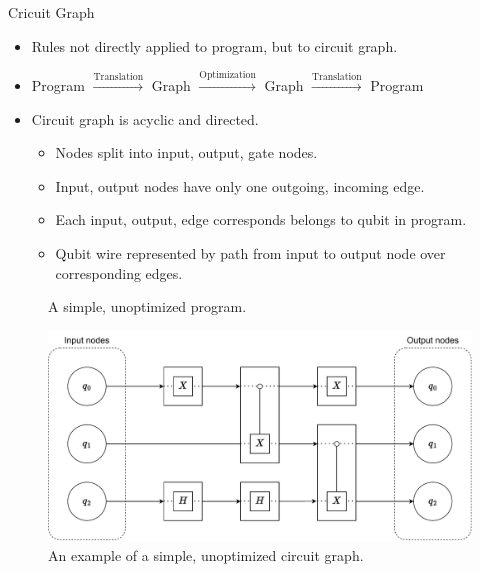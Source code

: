 \begin{frame}{Cricuit Graph}
    \begin{itemize}
        \item Rules not directly applied to program, but to circuit graph.
        \item Program $\xrightarrow{\text{Translation}}$ Graph $\xrightarrow{\text{Optimization}}$ Graph $\xrightarrow{\text{Translation}}$ Program  
        \item Circuit graph is acyclic and directed.
        \begin{itemize}
            \item Nodes split into input, output, gate nodes.
            \item Input, output nodes have only one outgoing, incoming edge. 
            \item Each input, output, edge corresponds belongs to qubit in program.
            \item Qubit wire represented by path from input to output node over corresponding edges.
        \end{itemize}
    \end{itemize}
    \vfill
    \begin{minipage}{.35\textwidth}
        \begin{figure}
            \centering
            
            \caption{A simple, unoptimized program.}
        \end{figure}
    \end{minipage}
    \begin{minipage}{.60\textwidth}
        \begin{figure}[htp]
            \centering     
            \includegraphics[width=.9\textwidth]{../figures/drawio/circuit_graph_unoptimized.pdf}
            \caption{An example of a simple, unoptimized circuit graph.}

\end{figure}
\end{minipage}
\end{frame}
